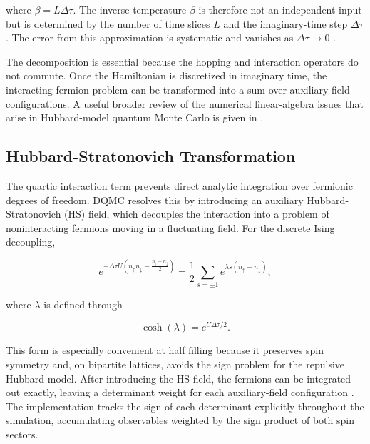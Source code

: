 \documentclass[9pt,a4paper,twocolumn,twoside]{rho-class/rho}
\begin{document}
where $\beta=L\Delta\tau$. The inverse temperature $\beta$ is therefore not an independent input but is determined by the number of time slices $L$ and the imaginary-time step $\Delta\tau$. The error from this approximation is systematic and vanishes as $\Delta\tau \to 0$ \cite{blankenbecler1981}.

The decomposition is essential because the hopping and interaction operators do not commute. Once the Hamiltonian is discretized in imaginary time, the interacting fermion problem can be transformed into a sum over auxiliary-field configurations. A useful broader review of the numerical linear-algebra issues that arise in Hubbard-model quantum Monte Carlo is given in \cite{bai2009}.

\subsection{Hubbard-Stratonovich Transformation}

The quartic interaction term prevents direct analytic integration over fermionic degrees of freedom. DQMC resolves this by introducing an auxiliary Hubbard-Stratonovich (HS) field, which decouples the interaction into a problem of noninteracting fermions moving in a fluctuating field. For the discrete Ising decoupling,

\begin{equation}
e^{-\Delta\tau U(n_\uparrow n_\downarrow - \frac{n_\uparrow+n_\downarrow}{2})}
=
\frac{1}{2} \sum_{s=\pm1}
e^{\lambda s(n_\uparrow-n_\downarrow)},
\end{equation}

where $\lambda$ is defined through

\begin{equation}
\cosh(\lambda)=e^{U\Delta\tau/2}.
\end{equation}

This form is especially convenient at half filling because it preserves spin symmetry and, on bipartite lattices, avoids the sign problem for the repulsive Hubbard model. After introducing the HS field, the fermions can be integrated out exactly, leaving a determinant weight for each auxiliary-field configuration \cite{hirsch1983,blankenbecler1981}. The implementation tracks the sign of each determinant explicitly throughout the simulation, accumulating observables weighted by the sign product of both spin sectors.
\end{document}

